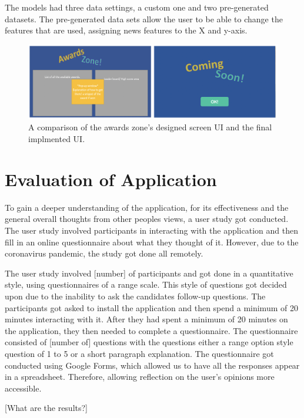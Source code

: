 	The models had three data settings, a custom one and two pre-generated datasets. The pre-generated data sets allow the user to be able to change the features that are used, assigning news features to the X and y-axis.
	
	\begin{figure}[t]
		\includegraphics[width=15cm]{graphics/awards_zone.png}
		\caption{A comparison of the awards zone's designed screen UI and the final implmented UI.}
		\label{fig:ui_az}
	\end{figure}
	
			
	\section{Evaluation of Application}
		\label{sec:app_evaluation}
	
		To gain a deeper understanding of the application, for its effectiveness and the general overall thoughts from other peoples views, a user study got conducted. The user study involved participants in interacting with the application and then fill in an online questionnaire about what they thought of it. However, due to the coronavirus pandemic, the study got done all remotely.
		
		The user study involved [number] of participants and got done in a quantitative style, using questionnaires of a range scale. This style of questions got decided upon due to the inability to ask the candidates follow-up questions. The participants got asked to install the application and then spend a minimum of 20 minutes interacting with it. After they had spent a minimum of 20 minutes on the application, they then needed to complete a questionnaire. The questionnaire consisted of [number of] questions with the questions either a range option style question of 1 to 5 or a short paragraph explanation. The questionnaire got conducted using Google Forms, which allowed us to have all the responses appear in a spreadsheet. Therefore, allowing reflection on the user's opinions more accessible.
		
		[What are the results?]
		